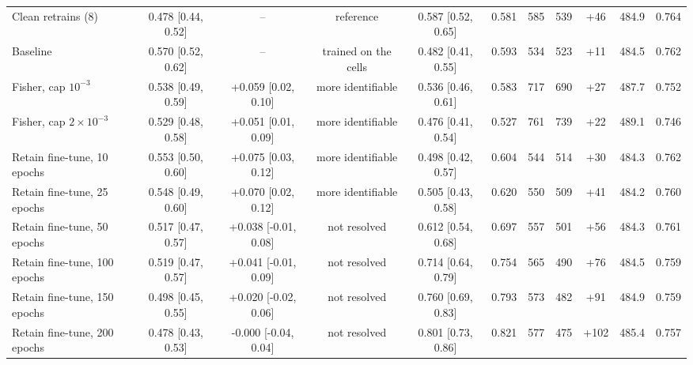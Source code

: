 \begin{tabular}{lcccccccccc}
Clean retrains (8) & 0.478 [0.44, 0.52] & -- & reference & 0.587 [0.52, 0.65] & 0.581 & 585 & 539 & +46 & 484.9 & 0.764 \\
Baseline & 0.570 [0.52, 0.62] & -- & trained on the cells & 0.482 [0.41, 0.55] & 0.593 & 534 & 523 & +11 & 484.5 & 0.762 \\
Fisher, cap $10^{-3}$ & 0.538 [0.49, 0.59] & +0.059 [0.02, 0.10] & more identifiable & 0.536 [0.46, 0.61] & 0.583 & 717 & 690 & +27 & 487.7 & 0.752 \\
Fisher, cap $2\times 10^{-3}$ & 0.529 [0.48, 0.58] & +0.051 [0.01, 0.09] & more identifiable & 0.476 [0.41, 0.54] & 0.527 & 761 & 739 & +22 & 489.1 & 0.746 \\
Retain fine-tune, 10 epochs & 0.553 [0.50, 0.60] & +0.075 [0.03, 0.12] & more identifiable & 0.498 [0.42, 0.57] & 0.604 & 544 & 514 & +30 & 484.3 & 0.762 \\
Retain fine-tune, 25 epochs & 0.548 [0.49, 0.60] & +0.070 [0.02, 0.12] & more identifiable & 0.505 [0.43, 0.58] & 0.620 & 550 & 509 & +41 & 484.2 & 0.760 \\
Retain fine-tune, 50 epochs & 0.517 [0.47, 0.57] & +0.038 [-0.01, 0.08] & not resolved & 0.612 [0.54, 0.68] & 0.697 & 557 & 501 & +56 & 484.3 & 0.761 \\
Retain fine-tune, 100 epochs & 0.519 [0.47, 0.57] & +0.041 [-0.01, 0.09] & not resolved & 0.714 [0.64, 0.79] & 0.754 & 565 & 490 & +76 & 484.5 & 0.759 \\
Retain fine-tune, 150 epochs & 0.498 [0.45, 0.55] & +0.020 [-0.02, 0.06] & not resolved & 0.760 [0.69, 0.83] & 0.793 & 573 & 482 & +91 & 484.9 & 0.759 \\
Retain fine-tune, 200 epochs & 0.478 [0.43, 0.53] & -0.000 [-0.04, 0.04] & not resolved & 0.801 [0.73, 0.86] & 0.821 & 577 & 475 & +102 & 485.4 & 0.757 \\
\bottomrule
\end{tabular}

